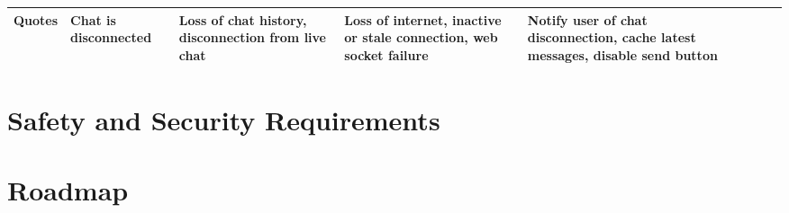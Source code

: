 \documentclass{article}
\begin{document}
\begin{landscape}
\begin{table}[H]
\begin{adjustbox}{width=\paperwidth}
\begin{tabular}{|l|l|l|l|l|l|l|}
				\hline
				Quotes                          & Chat is disconnected                                     & Loss of chat history, disconnection from live chat                              & Loss of internet, inactive or stale connection, web socket failure                           & Notify user of chat disconnection, cache latest messages, disable send button           & ~           & ~             \\
				\hline
			\end{tabular}
		\end{adjustbox}
	\end{table}
\end{landscape}

\section{Safety and Security Requirements}


\section{Roadmap}

\end{document}
